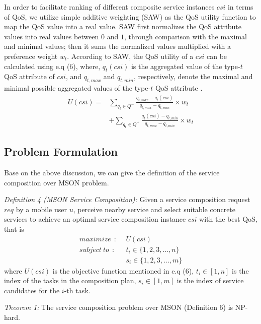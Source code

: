 \documentclass[10pt,journal,compsoc]{IEEEtran}
\begin{document}
In order to facilitate ranking of different composite service instances $csi$ in terms of QoS, we utilize simple additive weighting (SAW) as the QoS utility function to map the QoS value into a real value. SAW first normalizes the QoS attribute values into real values between $0$ and $1$, through comparison with the maximal and minimal values; then it sums the normalized values multiplied with a preference weight $w_t$. According to SAW, the QoS utility of a $csi$ can be calculated using e.q (6), where, $q_t(csi)$ is the aggregated value of the type-$t$ QoS attribute of $csi$, and $q_{t,max}$ and $q_{t,min}$, respectively, denote the maximal and minimal possible aggregated values of the type-$t$ QoS attribute \cite{Wu2016}.
\begin{align}
U(csi) = & \sum_{q_t \in Q^-} \frac{q_{t,max}-q_t(csi)}{q_{t,max}-q_{t,min}}\times w_t \\\nonumber
& +\sum_{q_t \in Q^+} \frac{q_t(csi)-q_{t,min}}{q_{t,max}-q_{t,min}}\times w_t
\end{align}

\subsection{Problem Formulation}
Base on the above discussion, we can give the definition of the service composition over MSON problem.

\textit{Definition 4 (MSON Service Composition):} Given a service composition request $req$ by a mobile user $u$, perceive nearby service and select suitable concrete services to achieve an optimal service composition instance $csi$ with the best QoS, that is
\begin{align}
maximize      \ \ : \ \ & U(csi)   \\\nonumber
subject\ to   \ \ : \ \ & t_i \in \{1,2,3,...,n\}  \\\nonumber
                        & s_i \in \{1,2,3,...,m \}
\end{align}
where $U(csi)$ is the objective function mentioned in e.q (6), $t_i \in [1,n]$ is the index of the tasks in the composition plan, $s_i \in [1, m]$ is the index of service candidates for the $i$-th task.

\textit{Theorem 1:} The service composition problem over MSON (Definition 6) is NP-hard.
\end{document}
